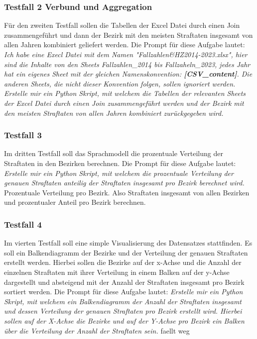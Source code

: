 \documentclass[11pt,a4paper]{article}
\begin{document}
\subsubsection{Testfall 2 Verbund und Aggregation}
    Für den zweiten Testfall sollen die Tabellen der Excel Datei durch einen Join zusammengeführt und dann der Bezirk mit den meisten Straftaten insgesamt von allen Jahren kombiniert geliefert werden. Die Prompt für diese Aufgabe lautet: \emph{Ich habe eine Execl Datei mit dem Namen "Fallzahlen\&HZ2014-2023.xlsx", hier sind die Inhalte von den Sheets Fallzahlen\_2014 bis Fallzaheln\_2023, jedes Jahr hat ein eigenes Sheet mit der gleichen Namenskonvention: \textbf{[CSV\_content]}. Die anderen Sheets, die nicht dieser Konvention folgen, sollen ignoriert werden. Erstelle mir ein Python Skript, mit welchem die Tabellen der relevanten Sheets der Excel Datei durch einen Join zusammengeführt werden und der Bezirk mit den meisten Straftaten von allen Jahren kombiniert zurückgegeben wird.}

\subsubsection{Testfall 3}
    Im dritten Testfall soll das Sprachmodell die prozentuale Verteilung der Straftaten in den Bezirken berechnen. Die Prompt für diese Aufgabe lautet: \emph{Erstelle mir ein Python Skript, mit welchem die prozentuale Verteilung der genauen Straftaten anteilig der Straftaten insgesamt pro Bezirk berechnet wird.}
    Prozentuale Verteilung pro Bezirk. Also Straftaten insgesamt von allen Bezirken und prozentualer Anteil pro Bezirk berechnen.

\subsubsection{Testfall 4}
    Im vierten Testfall soll eine simple Visualisierung des Datensatzes stattfinden. Es soll ein Balkendiagramm der Bezirke und der Verteilung der genauen Straftaten erstellt werden. Hierbei sollen die Bezirke auf der x-Achse und die Anzahl der einzelnen Straftaten mit ihrer Verteilung in einem Balken auf der y-Achse dargestellt und absteigend mit der Anzahl der Straftaten insgesamt pro Bezirk sortiert werden. Die Prompt für diese Aufgabe lautet: \emph{Erstelle mir ein Python Skript, mit welchem ein Balkendiagramm der Anzahl der Straftaten insgesamt und dessen Verteilung der genauen Straftaten pro Bezirk erstellt wird. Hierbei sollen auf der X-Achse die Bezirke und auf der Y-Achse pro Bezirk ein Balken über die Verteilung der Anzahl der Straftaten sein.}
    faellt weg
\end{document}
